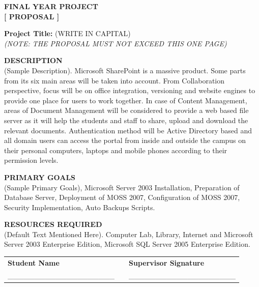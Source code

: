\documentclass[12pt, a4paper]{article}
\begin{document}
\begin{center}
    \textbf{\Large FINAL YEAR PROJECT} \\[0.2cm]
    \textbf{\large [ PROPOSAL ]}
\end{center}

\vspace{0.5cm}
\noindent \textbf{Project Title:} (WRITE IN CAPITAL) \\
\textit{(NOTE: THE PROPOSAL MUST NOT EXCEED THIS ONE PAGE)}

\vspace{0.5cm}
\noindent \textbf{DESCRIPTION} \\
(Sample Description). Microsoft SharePoint is a massive product. Some parts from its six main areas will be taken into account. From Collaboration perspective, focus will be on office integration, versioning and website engines to provide one place for users to work together. In case of Content Management, areas of Document Management will be considered to provide a web based file server as it will help the students and staff to share, upload and download the relevant documents. Authentication method will be Active Directory based and all domain users can access the portal from inside and outside the campus on their personal computers, laptops and mobile phones according to their permission levels.

\vspace{0.5cm}
\noindent \textbf{PRIMARY GOALS} \\
(Sample Primary Goals), Microsoft Server 2003 Installation, Preparation of Database Server, Deployment of MOSS 2007, Configuration of MOSS 2007, Security Implementation, Auto Backups Scripts.

\vspace{0.5cm}
\noindent \textbf{RESOURCES REQUIRED} \\
(Default Text Mentioned Here). Computer Lab, Library, Internet and Microsoft Server 2003 Enterprise Edition, Microsoft SQL Server 2005 Enterprise Edition.

\vspace{1.5cm}
\noindent
\begin{tabularx}{\textwidth}{@{}X c X@{}}
\textbf{Student Name} & \hspace{2cm} & \textbf{Supervisor Signature} \\[1cm]
\_\_\_\_\_\_\_\_\_\_\_\_\_\_\_\_\_\_\_\_ & & \_\_\_\_\_\_\_\_\_\_\_\_\_\_\_\_\_\_\_\_ \\
\end{tabularx}
\end{document}
